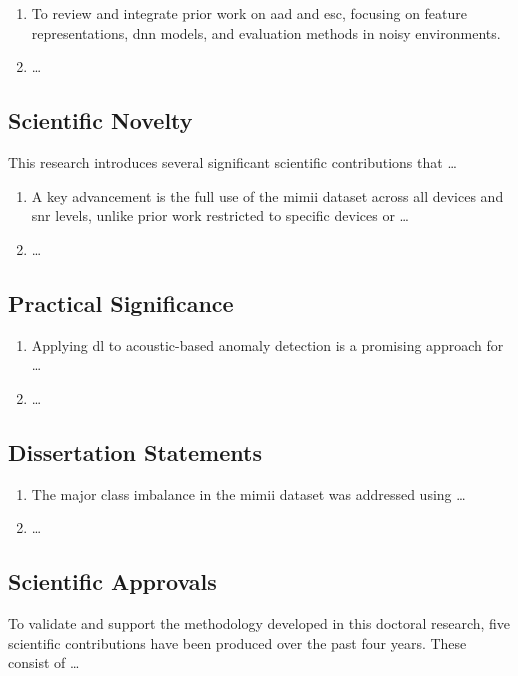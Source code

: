\begin{enumerate}[leftmargin=*]
    \item To review and integrate prior work on \gls{aad} and \gls{esc}, focusing on feature representations, \gls{dnn} models, and evaluation methods in noisy environments.
    
    \item \dots
\end{enumerate}

\subsection*{Scientific Novelty}\label{subsec:sci_nov}
This research introduces several significant scientific contributions that \dots

\begin{enumerate}[leftmargin=*]
	\item {A key advancement is the full use of the \gls{mimii} dataset across all devices and \gls{snr} levels, unlike prior work restricted to specific devices or \dots}
	\item \dots
\end{enumerate}


\subsection*{Practical Significance}\label{subsec:1_7}
\begin{enumerate}[leftmargin=*]
	\item Applying \gls{dl} to acoustic-based anomaly detection is a promising approach for \dots
	\item \dots
\end{enumerate}

\subsection*{Dissertation Statements} \label{subsec:des_state}
\begin{enumerate}[leftmargin=*]
	\item {The major class imbalance in the \gls{mimii} dataset was addressed using \dots}
	
	\item \dots
\end{enumerate}

\subsection*{Scientific Approvals} \label{sec:scie_app}
{To validate and support the methodology developed in this doctoral research, five scientific contributions have been produced over the past four years. These consist of \dots}

